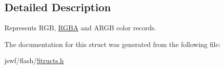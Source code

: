 \subsection{Detailed Description}
Represents {\ttfamily R\+G\+B}, {\ttfamily \hyperlink{structjswf_1_1flash_1_1_r_g_b_a}{R\+G\+B\+A}} and {\ttfamily A\+R\+G\+B} color records. 

The documentation for this struct was generated from the following file\+:\begin{DoxyCompactItemize}
\item 
jswf/flash/\hyperlink{_structs_8h}{Structs.\+h}\end{DoxyCompactItemize}
